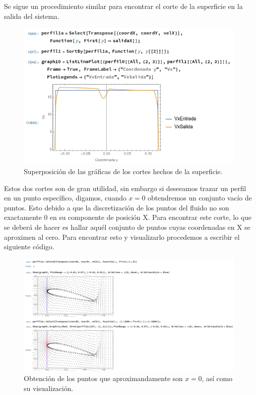\documentclass[12pt, letterpaper]{article}
\begin{document}
Se sigue un procedimiento similar para encontrar el corte de la superficie en la salida del sistema.

\begin{figure}[H]
	\centering
	\includegraphics[width=\textwidth]{20.png}
	\caption{Superposición de las gráficas de los cortes hechos de la superficie.}
\end{figure}

Estos dos cortes son de gran utilidad, sin embargo si deseeamos trazar un perfil en un punto específico, digamos, cuando $x = 0$ obtendremos un conjunto vacío de puntos. Esto debido a que la discretización de los puntos del fluido no son exactamente 0 en su componente de posición X. Para encontrar este corte, lo que se deberá de hacer es hallar aquél conjunto de puntos cuyas coordenadas en X se aproximen al cero. Para encontrar esto y visualizarlo procedemos a escribir el siguiente código.

\begin{figure}[H]
	\centering
	\includegraphics[width=\textwidth]{21.png}
	\caption{Obtención de los puntos que aproximandamente son $x = 0$, así como su visualización.}
\end{figure}
\end{document}
